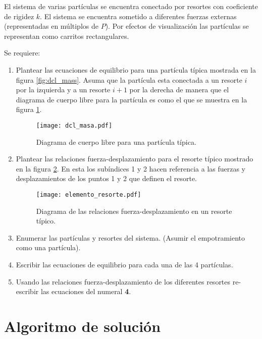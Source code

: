 El sistema de varias partículas se encuentra conectado por resortes con 
coeficiente de rigidez $k$. El sistema se encuentra sometido a diferentes 
fuerzas externas (representadas en múltiplos de $P$). Por efectos de 
visualización las partículas se representan como carritos rectangulares.

Se requiere:

\begin{enumerate}

\item
Plantear las ecuaciones de equilibrio para una partícula típica mostrada en 
la figura \ref{fig:dcl_mass}. Asuma que la partícula esta conectada a un 
resorte $i$ por la izquierda y a un resorte $i+1$ por la derecha de manera que 
el diagrama de cuerpo libre para la partícula es como el que se muestra en la 
figura \ref{fig:dcl_masa}.

\begin{figure}[H]
\centering
\texttt{[image: dcl\_masa.pdf]}
\caption{Diagrama de cuerpo libre para una partícula típica.}
\label{fig:dcl_masa}
\end{figure}

\item
Plantear las relaciones fuerza-desplazamiento para el resorte típico 
mostrado en la figura \ref{fig:elemento_resorte}. En esta los subíndices 1 y 2 
hacen referencia a las fuerzas y desplazamientos de los puntos 1 y 2 que 
definen el resorte.
\begin{figure}[H]
\centering
\texttt{[image: elemento\_resorte.pdf]}
\caption{Diagrama de las relaciones fuerza-desplazamiento en un resorte 
típico.}
\label{fig:elemento_resorte}
\end{figure}

\item
Enumerar las partículas y resortes del sistema. (Asumir el empotramiento 
como una partícula).

\item
Escribir las ecuaciones de equilibrio para cada una de las 4 partículas.

\item
Usando las relaciones fuerza-desplazamiento de los diferentes resortes 
re-escribir las ecuaciones del numeral \textbf{4}.

\end{enumerate}





\section{Algoritmo de solución}

